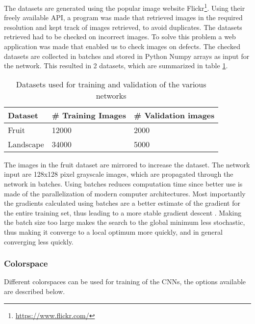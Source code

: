 The datasets are generated using the popular image website Flickr\footnote{\url{https://www.flickr.com/}}.
Using their freely available API, a program was made that retrieved images in the required resolution and kept track of images retrieved, to avoid duplicates. The datasets retrieved had to be checked on incorrect images. To solve this problem a web application was made that enabled us to check images on defects. The checked datasets are collected in batches and stored in Python Numpy arrays as input for the network.
This resulted in 2 datasets, which are summarized in table \ref{tab:dataset}.

\begin{table}[h!]
	\centering
	\caption{Datasets used for training and validation of the various networks}
	\label{tab:dataset}
	\begin{tabular}{|l|l|l|}
		\hline
		\textbf{Dataset}   & \textbf{\# Training Images} & \textbf{\# Validation images} \\ \hline \hline
		Fruit\footnote     & 12000            & 2000              \\ \hline
		Landscape & 34000           & 5000              \\ \hline
	\end{tabular}
\end{table}


The images in the fruit dataset are mirrored to increase the dataset. The network input are 128x128 pixel grayscale images, which are propagated through the network in batches. Using batches reduces computation time since better use is made of the parallelization of modern computer architectures. Most importantly the gradients calculated using batches are a better estimate of the gradient for the entire training set, thus leading to a more stable gradient descent \cite{ioffe2015batch}. Making the batch size too large makes the search to the global minimum less stochastic, thus making it converge to a local optimum more quickly, and in general converging less quickly. \\

\subsubsection{Colorspace}
Different colorspaces can be used for training of the CNNs, the options available are described below.\\


